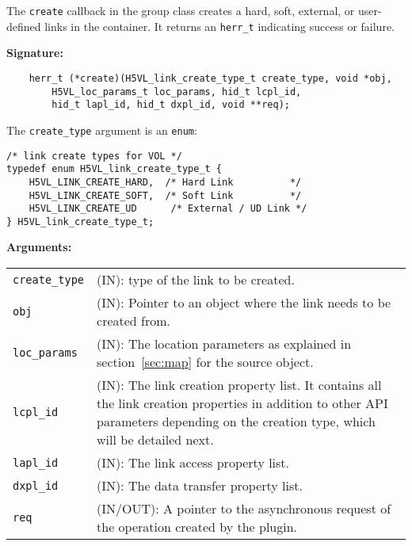 The \texttt{create} callback in the group class creates a hard,
soft, external, or user-defined links in the container. It returns an
\texttt{herr\_t} indicating success or failure.\bigskip

\begin{mdframed}[style=bgbox]
\textbf{Signature:}
\begin{lstlisting}
    herr_t (*create)(H5VL_link_create_type_t create_type, void *obj,
        H5VL_loc_params_t loc_params, hid_t lcpl_id, 
        hid_t lapl_id, hid_t dxpl_id, void **req);
\end{lstlisting}

The \texttt{create\_type} argument is an \texttt{enum}:
\begin{lstlisting}
/* link create types for VOL */
typedef enum H5VL_link_create_type_t {
    H5VL_LINK_CREATE_HARD,  /* Hard Link          */
    H5VL_LINK_CREATE_SOFT,  /* Soft Link          */
    H5VL_LINK_CREATE_UD      /* External / UD Link */
} H5VL_link_create_type_t;
\end{lstlisting}

\textbf{Arguments:}\\
\begin{tabular}{l p{10cm}}
  \texttt{create\_type} & (IN): type of the link to be created.\\
  \texttt{obj} & (IN): Pointer to an object where the link needs to be
  created from.\\
  \texttt{loc\_params} & (IN): The location parameters as explained in
  section~\ref{sec:map} for the source object. \\
  \texttt{lcpl\_id} & (IN): The link creation property list. It contains
  all the link creation properties in addition to other API parameters
  depending on the creation type, which will be detailed next.\\
  \texttt{lapl\_id} & (IN): The link access property list.\\
  \texttt{dxpl\_id} & (IN): The data transfer property list.\\
  \texttt{req} & (IN/OUT): A pointer to the asynchronous request of the
  operation created by the plugin.\\
\end{tabular}
\end{mdframed}

